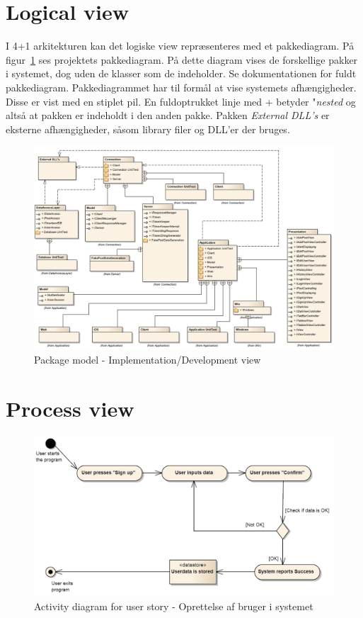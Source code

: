 \section{Logical view}
I 4+1 arkitekturen kan det logiske view repræsenteres med et pakkediagram.
På figur~\ref{fig:packageDiagram} ses projektets pakkediagram. På dette diagram vises de forskellige pakker i systemet, dog uden de klasser som de indeholder. Se dokumentationen for fuldt pakkediagram.
Pakkediagrammet har til formål at vise systemets afhængigheder. Disse er vist med en stiplet pil. En fuldoptrukket linje med + betyder "\textit{nested} og altså at pakken er indeholdt i den anden pakke. Pakken \textit{External DLL's} er eksterne afhængigheder, såsom library filer og DLL'er der bruges.

\begin{landscape}
	\begin{figure}[H]
		\centering
		\includegraphics[width=\linewidth]{figs/arkitektur/packageDiagramNoImpl.PNG}
		\caption{Package model - Implementation/Development view}
		\label{fig:packageDiagram}
	\end{figure}
\end{landscape}

\section{Process view}

\begin{figure}
\centering
\includegraphics[width=0.7\linewidth]{figs/arkitektur/addUserActivity.PNG}
\caption{Activity diagram for user story - Oprettelse af bruger i systemet}
\label{fig:addUserActivity}
\end{figure}


